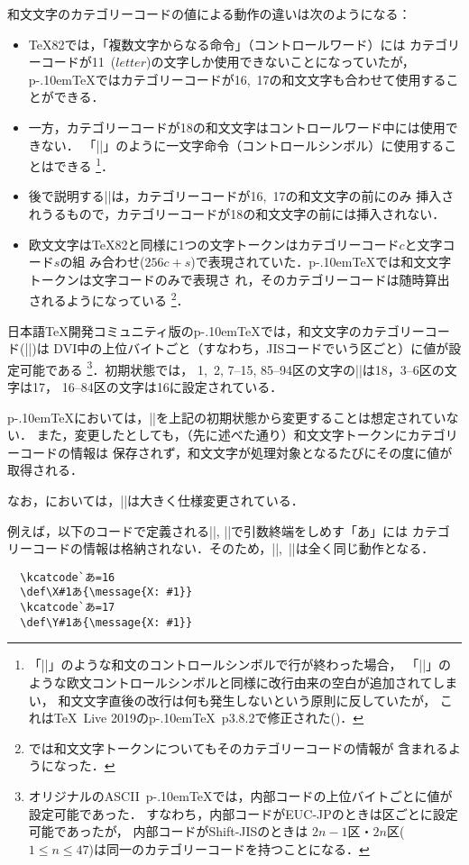 \documentclass[a4paper,11pt,nomag]{jsarticle}
\def\pTeX{p\kern-.10em\TeX}
\begin{document}
和文文字のカテゴリーコードの値による動作の違いは次のようになる：
\begin{itemize}
  \item \TeX82では，「複数文字からなる命令」（コントロールワード）には
    カテゴリーコードが11~($\mathit{letter}$)の文字しか使用できないことになっていたが，
    \pTeX ではカテゴリーコードが16,~17の和文文字も合わせて使用することができる．
  \item 一方，カテゴリーコードが18の和文文字はコントロールワード中には使用できない．
    「|\】|」のように一文字命令（コントロールシンボル）に使用することはできる
    \footnote{「|\】|」のような和文のコントロールシンボルで行が終わった場合，
    「|\!|」のような欧文コントロールシンボルと同様に改行由来の空白が追加されてしまい，
    和文文字直後の改行は何も発生しないという原則に反していたが，
    これは\TeX~Live 2019の\pTeX~p3.8.2で修正された(\cite{build37})．}．
  \item 後で説明する|\jcharwidowpenalty|は，カテゴリーコードが16,~17の和文文字の前にのみ
    挿入されうるもので，カテゴリーコードが18の和文文字の前には挿入されない．
  \item 欧文文字は\TeX82と同様に1つの文字トークンはカテゴリーコード$c$と文字コード$s$の組
    み合わせ($256c+s$)で表現されていた．\pTeX では和文文字トークンは文字コードのみで表現さ
    れ，そのカテゴリーコードは随時算出されるようになっている
    \footnote{\upTeX では和文文字トークンについてもそのカテゴリーコードの情報が
    含まれるようになった．}．
\end{itemize}

\begin{cslist}
  \csitem[\.{kcatcode} <character code>=<16--18>]
  日本語\TeX 開発コミュニティ版の\pTeX では，和文文字のカテゴリーコード(|\kcatcode|)は
  DVI中の上位バイトごと（すなわち，JISコードでいう区ごと）に値が設定可能である
  \footnote{%
    オリジナルのASCII~\pTeX では，内部コードの上位バイトごとに値が設定可能であった．
    すなわち，内部コードがEUC-JPのときは区ごとに設定可能であったが，
    内部コードがShift-JISのときは
    $2n-1$区・$2n$区($1\leq n\leq 47$)は同一のカテゴリーコードを持つことになる．
  }．初期状態では，
  1,~2, 7--15, 85--94区の文字の|\kcatcode|は18，3--6区の文字は17，
  16--84区の文字は16に設定されている．

  \pTeX においては，|\kcatcode|を上記の初期状態から変更することは想定されていない．
  また，変更したとしても，（先に述べた通り）和文文字トークンにカテゴリーコードの情報は
  保存されず，和文文字が処理対象となるたびにその度に値が取得される．

  なお，\upTeX においては，|\kcatcode|は大きく仕様変更されている．
\end{cslist}
\begin{dangerous}
  例えば，以下のコードで定義される|\X|, |\Y|で引数終端をしめす「あ」には
  カテゴリーコードの情報は格納されない．そのため，|\X|,~|\Y|は全く同じ動作となる．
  \begin{verbatim}
  \kcatcode`あ=16
  \def\X#1あ{\message{X: #1}}
  \kcatcode`あ=17
  \def\Y#1あ{\message{X: #1}}
  \end{verbatim}
\end{dangerous}
\end{document}
